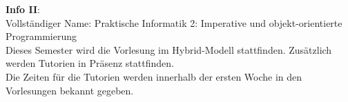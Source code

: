 \textbf{Info II}:\\
Vollständiger Name: Praktische Informatik 2: Imperative und objekt-orientierte Programmierung\\
Dieses Semester wird die Vorlesung im Hybrid-Modell stattfinden. Zusätzlich werden Tutorien in Präsenz stattfinden.\\

Die Zeiten für die Tutorien werden innerhalb der ersten Woche in den Vorlesungen bekannt gegeben.
